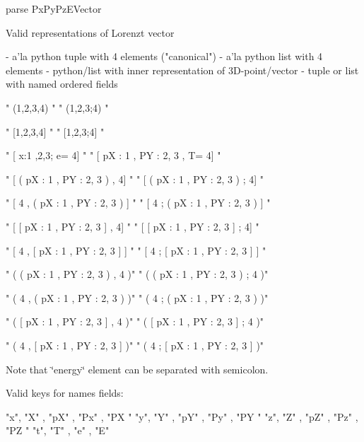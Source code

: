 parse Px\+Py\+Pz\+E\+Vector 

Valid representations of Lorenzt vector \begin{DoxyVerb}- a'la python tuple with 4 elements ("canonical")
- a'la python list with 4 elements
- python/list with inner representation of 3D-point/vector
- tuple or list with named ordered fields
\end{DoxyVerb}



\begin{DoxyCode}
\textcolor{stringliteral}{" (1,2,3,4) "}
\textcolor{stringliteral}{" (1,2,3;4) "}

\textcolor{stringliteral}{" [1,2,3,4] "}
\textcolor{stringliteral}{" [1,2,3;4] "}

\textcolor{stringliteral}{" [ x:1 ,2,3; e= 4] "}
\textcolor{stringliteral}{" [ pX : 1 , PY : 2, 3 , T= 4] "}

\textcolor{stringliteral}{" [ ( pX : 1 , PY : 2, 3 ) , 4] "}
\textcolor{stringliteral}{" [ ( pX : 1 , PY : 2, 3 ) ; 4] "}

\textcolor{stringliteral}{" [ 4 , ( pX : 1 , PY : 2, 3 ) ] "}
\textcolor{stringliteral}{" [ 4 ; ( pX : 1 , PY : 2, 3 ) ] "}

\textcolor{stringliteral}{" [ [ pX : 1 , PY : 2, 3 ] , 4] "}
\textcolor{stringliteral}{" [ [ pX : 1 , PY : 2, 3 ] ; 4] "}

\textcolor{stringliteral}{" [ 4 , [ pX : 1 , PY : 2, 3 ] ] "}
\textcolor{stringliteral}{" [ 4 ; [ pX : 1 , PY : 2, 3 ] ] "}

\textcolor{stringliteral}{" ( ( pX : 1 , PY : 2, 3 ) , 4 )"}
\textcolor{stringliteral}{" ( ( pX : 1 , PY : 2, 3 ) ; 4 )"}

\textcolor{stringliteral}{" ( 4 , ( pX : 1 , PY : 2, 3 ) )"}
\textcolor{stringliteral}{" ( 4 ; ( pX : 1 , PY : 2, 3 ) )"}

\textcolor{stringliteral}{" ( [ pX : 1 , PY : 2, 3 ] , 4 )"}
\textcolor{stringliteral}{" ( [ pX : 1 , PY : 2, 3 ] ; 4 )"}

\textcolor{stringliteral}{" ( 4 , [ pX : 1 , PY : 2, 3 ] )"}
\textcolor{stringliteral}{" ( 4 ; [ pX : 1 , PY : 2, 3 ] )"}
\end{DoxyCode}


Note that \char`\"{}energy\char`\"{} element can be separated with semicolon.

Valid keys for names fields\+:


\begin{DoxyCode}
\textcolor{stringliteral}{"x"}, \textcolor{stringliteral}{"X"} , \textcolor{stringliteral}{"pX"} , \textcolor{stringliteral}{"Px"} , \textcolor{stringliteral}{"PX "}
\textcolor{stringliteral}{"y"}, \textcolor{stringliteral}{"Y"} , \textcolor{stringliteral}{"pY"} , \textcolor{stringliteral}{"Py"} , \textcolor{stringliteral}{"PY "}
\textcolor{stringliteral}{"z"}, \textcolor{stringliteral}{"Z"} , \textcolor{stringliteral}{"pZ"} , \textcolor{stringliteral}{"Pz"} , \textcolor{stringliteral}{"PZ "}
\textcolor{stringliteral}{"t"}, \textcolor{stringliteral}{"T"} , \textcolor{stringliteral}{"e"}  , \textcolor{stringliteral}{"E"}
\end{DoxyCode}


